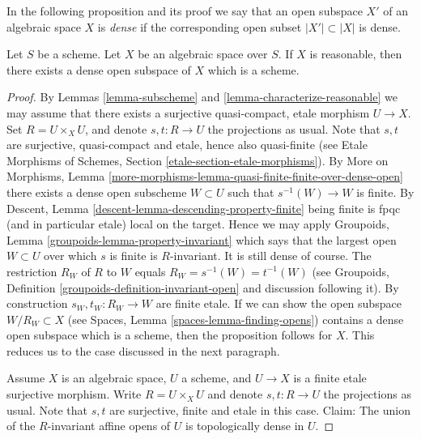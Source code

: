 \noindent
In the following proposition and its proof we say that an open subspace
$X'$ of an algebraic space $X$ is {\it dense} if the corresponding
open subset $|X'| \subset |X|$ is dense.

\begin{proposition}
\label{proposition-reasonable-open-dense-scheme}
Let $S$ be a scheme.
Let $X$ be an algebraic space over $S$.
If $X$ is reasonable, then there exists a dense open subspace
of $X$ which is a scheme.
\end{proposition}

\begin{proof}
By Lemmas \ref{lemma-subscheme} and \ref{lemma-characterize-reasonable}
we may assume that there exists a surjective quasi-compact, etale morphism
$U \to X$. Set $R = U \times_X U$, and denote $s, t : R \to U$ the projections
as usual. Note that $s, t$ are surjective, quasi-compact and etale, hence
also quasi-finite (see
Etale Morphisms of Schemes, Section \ref{etale-section-etale-morphisms}).
By
More on Morphisms,
Lemma \ref{more-morphisms-lemma-quasi-finite-finite-over-dense-open}
there exists a dense open subscheme $W \subset U$ such that
$s^{-1}(W) \to W$ is finite. By
Descent, Lemma \ref{descent-lemma-descending-property-finite}
being finite is fpqc (and in particular etale) local on the target.
Hence we may apply
Groupoids, Lemma \ref{groupoids-lemma-property-invariant}
which says that the largest open $W \subset U$ over which $s$ is
finite is $R$-invariant. It is still dense of course.
The restriction $R_W$ of $R$ to $W$ equals $R_W = s^{-1}(W) = t^{-1}(W)$
(see Groupoids, Definition \ref{groupoids-definition-invariant-open}
and discussion following it).
By construction $s_W, t_W : R_W \to W$ are finite etale.
If we can show the open subspace $W/R_W \subset X$ (see
Spaces, Lemma \ref{spaces-lemma-finding-opens})
contains a dense open subspace which is a scheme, then the
proposition follows for $X$. This reduces us to the case discussed
in the next paragraph.

\medskip\noindent
Assume $X$ is an algebraic space, $U$ a scheme, and $U \to X$ is a finite
etale surjective morphism. Write $R = U \times_X U$ and denote
$s, t : R \to U$ the projections as usual. Note that $s, t$ are surjective,
finite and etale in this case. Claim:
The union of the $R$-invariant affine opens of $U$ is topologically
dense in $U$.


\end{proof}
